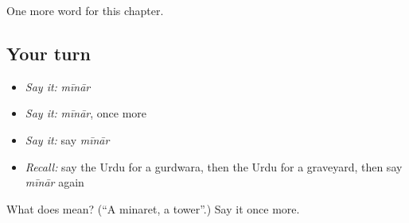 \begin{grammarlens}[title={What you've built}]
One more word for this chapter.
\end{grammarlens}

\subsection*{Your turn}
\begin{itemize}
\raggedright
  \item \emph{Say it:} \emph{mīnār}
  \item \emph{Say it:} \emph{mīnār}, once more
  \item \emph{Say it:} say \emph{mīnār}
  \item \emph{Recall:} say the Urdu for a gurdwara, then the Urdu for a graveyard, then say \emph{mīnār} again
\end{itemize}

\begin{tcolorbox}[breakable,colback=teal!4,colframe=teal!35!black,title={Before you move on}]
What does  mean? (\textquotedblleft{}A minaret, a tower\textquotedblright{}.) Say it once more.
\end{tcolorbox}
